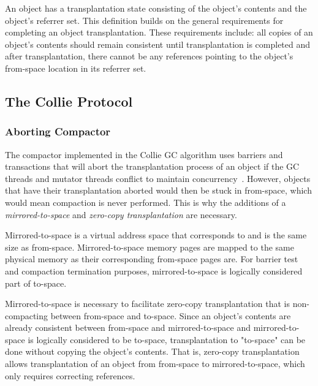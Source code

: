 \documentclass{sig-alternate}
\begin{document}
An object has a transplantation state consisting of the object's contents 
and the object's referrer set. This definition builds on the general requirements
for completing an object transplantation. These
requirements include: all copies of an object's contents should remain consistent
until transplantation is completed and after transplantation, there cannot be any
references pointing to the object's from-space location in its referrer set.



\subsection{The Collie Protocol}
\label{sec:collieAlgorithm}


\subsubsection{Aborting Compactor}
\label{sec:collieAbortion}

The compactor implemented in the Collie GC algorithm uses barriers 
and transactions that will abort the transplantation process of an object if the
GC threads and mutator threads conflict to maintain concurrency~\cite{Iyengar:Collie}.
However, objects that have their transplantation aborted would then be stuck
in from-space, which would mean compaction is never performed. This is why
the additions of a \emph{mirrored-to-space} and \emph{zero-copy transplantation} are necessary.

Mirrored-to-space is a virtual address space that corresponds to and is the same
size as from-space. Mirrored-to-space memory pages are mapped to the same physical
memory as their corresponding from-space pages are. For barrier test and compaction 
termination purposes, mirrored-to-space is logically considered part of to-space.

Mirrored-to-space is necessary to facilitate zero-copy transplantation that is 
non-compacting between from-space and to-space. Since an object's contents are 
already consistent between from-space and mirrored-to-space and mirrored-to-space
is logically considered to be to-space, transplantation to "to-space"
can be done without copying the object's contents. That is, zero-copy transplantation
allows transplantation of an object from from-space to mirrored-to-space, which only
requires correcting references.
\end{document}
